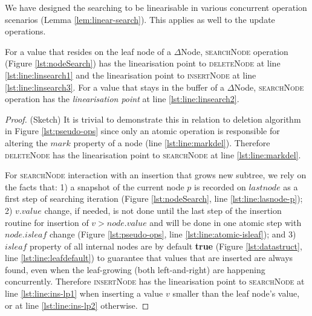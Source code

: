 We have designed the searching to be linearisable in various concurrent
operation scenarios (Lemma \ref{lem:linear-search}). This applies as well to the
update operations.

\begin{lemma} 
For a value that resides on the leaf node of a $\Delta$Node,
\textsc{searchNode} operation (Figure \ref{lst:nodeSearch}) has the linearisation 
point to \textsc{deleteNode} at line \ref{lst:line:linsearch1} and the
linearisation point to \textsc{insertNode} at line \ref{lst:line:linsearch3}. 
For a value that stays in the buffer of a $\Delta$Node, \textsc{searchNode} 
operation has the \textit{linearisation point} at line \ref{lst:line:linsearch2}.
\label{lem:linear-search}
\end{lemma}
\begin{proof}(Sketch) It is trivial to demonstrate this in relation to
deletion algorithm in Figure \ref{lst:pseudo-ops} since only an atomic operation
is responsible for altering the $mark$ property of a node (line
\ref{lst:line:markdel}).
Therefore \textsc{deleteNode} has the linearisation point to \textsc{searchNode} 
at line \ref{lst:line:markdel}. 


For \textsc{searchNode} interaction with an insertion that grows new subtree, we
rely on the facts that: 1) a snapshot of the current node $p$ is recorded on
$lastnode$ as a first step of searching iteration (Figure \ref{lst:nodeSearch},
line \ref{lst:line:lasnode-p}); 2) $v.value$ change, if needed, is not done
until the last step of the insertion routine for insertion of $v > node.value$
and will be done in one atomic step with $node.isleaf$ change (Figure
\ref{lst:pseudo-ops}, line \ref{lst:line:atomic-isleaf}); and 3) $isleaf$
property of all internal nodes are by default \textbf{true} (Figure
\ref{lst:datastruct}, line \ref{lst:line:leafdefault}) to guarantee that values
that are inserted are always found, even when the leaf-growing (both
left-and-right) are happening concurrently. Therefore
\textsc{insertNode} has the linearisation point to \textsc{searchNode} at line 
\ref{lst:line:ins-lp1} when inserting a value $v$ smaller than the leaf node's 
value, or at line \ref{lst:line:ins-lp2} otherwise. 



\end{proof}
